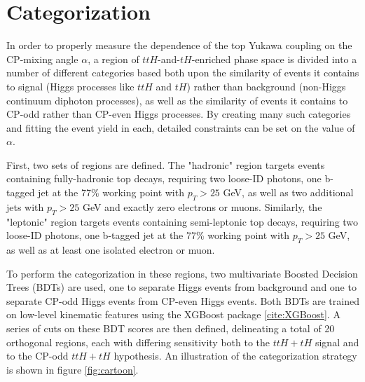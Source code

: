 \section{Categorization} \label{sec:ttHCPCategorization}

In order to properly measure the dependence of the top Yukawa coupling on the CP-mixing angle $\alpha$, a region of $ttH$-and-$tH$-enriched phase space  is divided into a number of different categories based both upon the similarity of events it contains to signal (Higgs processes like $ttH$ and $tH$) rather than background (non-Higgs continuum diphoton processes), as well as the similarity of events it contains to CP-odd rather than CP-even Higgs processes. By creating many such categories and fitting the event yield in each, detailed constraints can be set on the value of $\alpha$.

First, two sets of regions are defined. The "hadronic" region targets events containing fully-hadronic top decays, requiring two loose-ID photons, one b-tagged jet at the 77\% working point with $p_{T} > 25$ GeV, as well as two additional jets with $p_{T} > 25$ GeV and exactly zero electrons or muons. Similarly, the "leptonic" region targets events containing semi-leptonic top decays, requiring two loose-ID photons, one b-tagged jet at the 77\% working point with $p_{T} > 25$ GeV, as well as at least one isolated electron or muon.

To perform the categorization in these regions, two multivariate Boosted Decision Trees (BDTs) are used, one to separate Higgs events from background and one to separate CP-odd Higgs events from CP-even Higgs events. Both BDTs are trained on low-level kinematic features using the XGBoost package \ref{cite:XGBoost}. A series of cuts on these BDT scores are then defined, delineating a total of 20 orthogonal regions, each with differing sensitivity both to the $ttH+tH$ signal and to the CP-odd $ttH+tH$ hypothesis. An illustration of the categorization strategy is shown in figure \ref{fig:cartoon}.

